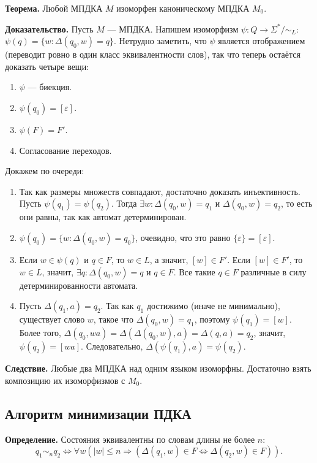 \QED

\textbf{Теорема.} Любой МПДКА $M$ изоморфен каноническому МПДКА $M_0$.

\textbf{Доказательство.} Пусть $M$ --- МПДКА. Напишем изоморфизм $\psi: Q \to \Sigma^*/\sim_L$: $\psi(q) = \{w: \Delta(q_0, w) = q\}$.
Нетрудно заметить, что $\psi$ является отображением (переводит ровно в один класс эквивалентности слов), так что теперь остаётся доказать четыре вещи: 
\begin{enumerate}
    \item $\psi$ --- биекция.
    \item $\psi(q_0) = [\varepsilon]$.
    \item $\psi(F) = F'$.
    \item Согласование переходов.
\end{enumerate}
Докажем по очереди:
\begin{enumerate}
    \item Так как размеры множеств совпадают, достаточно доказать инъективность.
        Пусть $\psi(q_1) = \psi(q_2)$. Тогда $\exists w: \Delta(q_0, w) = q_1$ и $\Delta(q_0, w) = q_2$, то есть они равны, так как автомат детерминирован.

    \item $\psi(q_0) = \{w: \Delta(q_0, w) = q_0\}$, очевидно, что это равно $\{\varepsilon\} = [\varepsilon]$.

    \item Если $w \in \psi(q)$ и $q \in F$, то $w \in L$, а значит, $[w] \in F'$.
        Если $[w] \in F'$, то $w \in L$, значит, $\exists q: \Delta(q_0, w) = q$ и $q \in F$.
        Все такие $q \in F$ различные в силу детерминированности автомата.

    \item Пусть $\Delta(q_1, a) = q_2$. Так как $q_1$ достижимо (иначе не минимально), существует слово $w$, такое что $\Delta(q_0, w) = q_1$, поэтому $\psi(q_1) = [w]$.
        Более того, $\Delta(q_0, wa) = \Delta(\Delta(q_0, w), a) = \Delta(q, a) = q_2$, значит, $\psi(q_2) = [wa]$.
        Следовательно, $\Delta(\psi(q_1), a) = \psi(q_2)$.
\end{enumerate}

\QED

\textbf{Следствие.} Любые два МПДКА над одним языком изоморфны. Достаточно взять композицию их изоморфизмов с $M_0$.

\subsection{Алгоритм минимизации ПДКА}
\textbf{Определение.} Состояния эквивалентны по словам длины не более $n$: 
\[
    q_1 \sim_n q_2 \iff \forall w(|w| \le n \Rightarrow (\Delta(q_1, w) \in F \iff \Delta(q_2, w) \in F)).
\]

